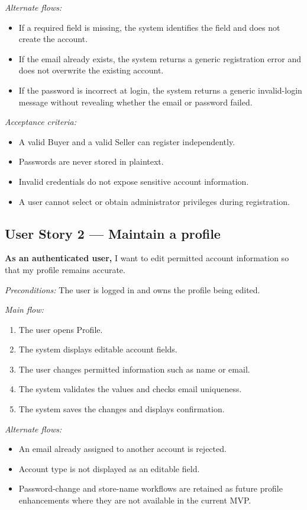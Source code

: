 \documentclass[11pt]{scrreprt}
\begin{document}
\textit{Alternate flows:}
\begin{itemize}
\item If a required field is missing, the system identifies the field and does
not create the account.
\item If the email already exists, the system returns a generic registration
error and does not overwrite the existing account.
\item If the password is incorrect at login, the system returns a generic
invalid-login message without revealing whether the email or password failed.
\end{itemize}

\textit{Acceptance criteria:}
\begin{itemize}
\item A valid Buyer and a valid Seller can register independently.
\item Passwords are never stored in plaintext.
\item Invalid credentials do not expose sensitive account information.
\item A user cannot select or obtain administrator privileges during
registration.
\end{itemize}

\subsection{User Story 2 --- Maintain a profile}
\textbf{As an authenticated user,} I want to edit permitted account
information so that my profile remains accurate.

\textit{Preconditions:} The user is logged in and owns the profile being edited.

\textit{Main flow:}
\begin{enumerate}
\item The user opens Profile.
\item The system displays editable account fields.
\item The user changes permitted information such as name or email.
\item The system validates the values and checks email uniqueness.
\item The system saves the changes and displays confirmation.
\end{enumerate}

\textit{Alternate flows:}
\begin{itemize}
\item An email already assigned to another account is rejected.
\item Account type is not displayed as an editable field.
\item Password-change and store-name workflows are retained as future profile
enhancements where they are not available in the current MVP.
\end{itemize}
\end{document}
